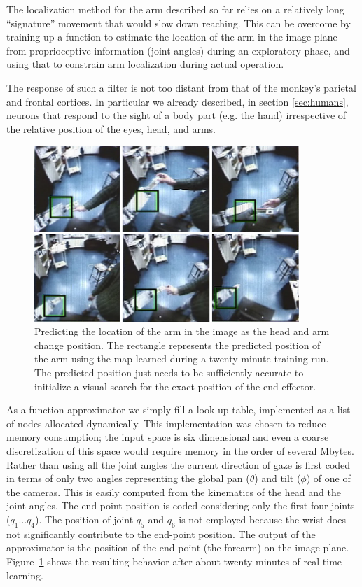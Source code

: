 The localization method for the arm described so far relies on a
relatively long ``signature'' movement that would slow down reaching.
This can be overcome by training up a function to estimate the
location of the arm in the image plane from proprioceptive information
(joint angles) during an exploratory phase, and using that to 
constrain arm localization during actual operation.

\ifrev
The response of such a filter is not too distant from that of the 
monkey's parietal and frontal cortices. In particular we already described, 
in section \ref{sec:humans}, neurons that respond to the sight of a 
body part (e.g. the hand) irrespective of the relative position 
of the eyes, head, and arms.
\fi

\begin{figure}[tbh]
\begin{center}
\includegraphics[width=10cm]{predict-position.eps}
\caption{ 
%
Predicting the location of the arm in the image as the head and arm
change position. The rectangle represents the predicted position of
the arm using the map learned during a twenty-minute training run.
The predicted position just needs to be sufficiently accurate to
initialize a visual search for the exact position of the end-effector.
%
}
\label{fig:predict-position}
\end{center}
\end{figure}


As a function approximator we simply fill a look-up table, implemented
as a list of nodes allocated dynamically. This implementation
was chosen to reduce memory consumption; the input space is six
dimensional and even a coarse discretization of this space would require
memory in the order of several Mbytes. Rather than using all the joint angles
the current direction of gaze is first coded in terms of only two angles
representing the global pan ($\theta$) and tilt ($\phi$) of one of the cameras.
This is easily computed from the kinematics of the head and the joint angles.
The end-point position is coded considering only the first four joints 
($q_1\ldots q_4$). The position of joint $q_5$ and $q_6$ is not employed because 
the wrist does not significantly contribute to the end-point position.
The output of the approximator is the position of the end-point (the forearm) on
the image plane. Figure~\ref{fig:predict-position} shows the resulting behavior
after about twenty minutes of real-time learning. 

